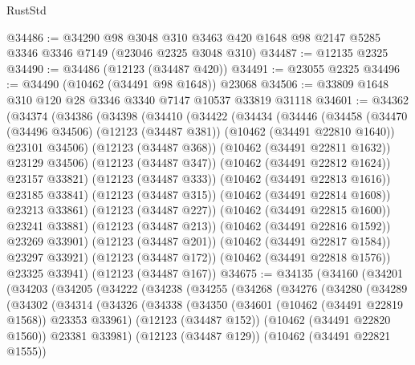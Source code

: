 \begin{lexlean}{RustStd}
\begin{coremodule}
@34486 := @34290
    @98
    @3048
    @310
    @3463
    @420
    @1648
    @98
    @2147
    @5285
    @3346
    @3346
    @7149
    (@23046 @2325 @3048 @310)
@34487 := @12135 @2325
@34490 := @34486 (@12123 (@34487 @420))
@34491 := @23055 @2325
@34496 := @34490 (@10462 (@34491 @98 @1648)) @23068
@34506 := @33809 @1648 @310 @120 @28 @3346 @3340 @7147 @10537 @33819 @31118
@34601 := @34362
    (@34374
      (@34386
        (@34398
          (@34410
            (@34422
              (@34434
                (@34446
                  (@34458
                    (@34470
                      (@34496 @34506)
                      (@12123 (@34487 @381))
                      (@10462 (@34491 @22810 @1640))
                      @23101
                      @34506)
                    (@12123 (@34487 @368))
                    (@10462 (@34491 @22811 @1632))
                    @23129
                    @34506)
                  (@12123 (@34487 @347))
                  (@10462 (@34491 @22812 @1624))
                  @23157
                  @33821)
                (@12123 (@34487 @333))
                (@10462 (@34491 @22813 @1616))
                @23185
                @33841)
              (@12123 (@34487 @315))
              (@10462 (@34491 @22814 @1608))
              @23213
              @33861)
            (@12123 (@34487 @227))
            (@10462 (@34491 @22815 @1600))
            @23241
            @33881)
          (@12123 (@34487 @213))
          (@10462 (@34491 @22816 @1592))
          @23269
          @33901)
        (@12123 (@34487 @201))
        (@10462 (@34491 @22817 @1584))
        @23297
        @33921)
      (@12123 (@34487 @172))
      (@10462 (@34491 @22818 @1576))
      @23325
      @33941)
    (@12123 (@34487 @167))
@34675 := @34135
    (@34160
      (@34201
        (@34203
          (@34205
            (@34222
              (@34238
                (@34255
                  (@34268
                    (@34276
                      (@34280
                        (@34289
                          (@34302
                            (@34314
                              (@34326
                                (@34338
                                  (@34350
                                    (@34601 (@10462 (@34491 @22819 @1568)) @23353 @33961)
                                    (@12123 (@34487 @152))
                                    (@10462 (@34491 @22820 @1560))
                                    @23381
                                    @33981)
                                  (@12123 (@34487 @129))
                                  (@10462 (@34491 @22821 @1555))

\end{coremodule}
\end{lexlean}
